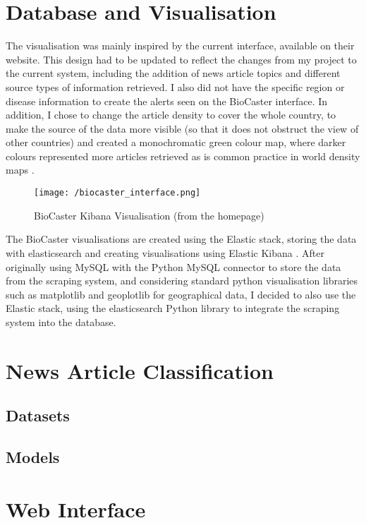 \documentclass{l4proj}
\begin{document}
\section{Database and Visualisation}
The visualisation was mainly inspired by the current \cite{biocaster} interface, available on their website. This design had to be updated to reflect the changes from my project to the current system, including the addition of news article topics and different source types of information retrieved. I also did not have the specific region or disease information to create the alerts seen on the BioCaster interface. In addition, I chose to change the article density to cover the whole country, to make the source of the data more visible (so that it does not obstruct the view of other countries) and created a monochromatic green colour map, where darker colours represented more articles retrieved as is common practice in world density maps \citep{ourworldindata_density, ons_density}.
\begin{figure}[h]
\texttt{[image: /biocaster\_interface.png]}
\caption{BioCaster Kibana Visualisation (from the homepage)}
\label{fig:biocaster}
\end{figure}
\par
The BioCaster visualisations are created using the Elastic stack, storing the data with elasticsearch and creating visualisations using Elastic Kibana \citep{elastic_stack}. After originally using MySQL with the Python MySQL connector to store the data from the scraping system, and considering standard python visualisation libraries such as matplotlib \citep{Hunter:2007} and geoplotlib \citep{geoplotlib} for geographical data, I decided to also use the Elastic stack, using the elasticsearch Python library to integrate the scraping system into the database.

\section{News Article Classification}
\subsection{Datasets}
\subsection{Models}
\section{Web Interface}
\end{document}
